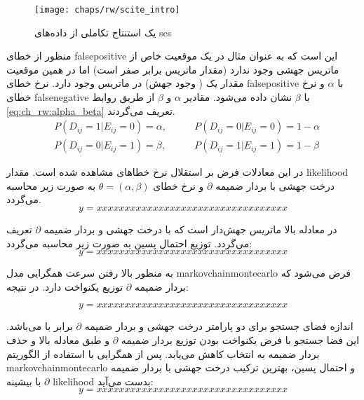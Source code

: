 \begin{figure}[!ht]
	\centerline{\texttt{[image: chaps/rw/scite\_intro]}}
	\caption{یک استنتاج تکاملی از داده‌های \gls{scs} \cite{jahn2016tree}}
	\label{fig:ch_rw:scite_intro}
\end{figure}

منظور از خطای \gls{falsepositive} این است که به عنوان مثال در یک موقعیت خاص از ماتریس  جهشی وجود ندارد (مقدار ماتریس برابر صفر است) اما در همین موقعیت مقدار یک ( وجود جهش) در ماتریس  وجود دارد. نرخ خطای \gls{falsepositive} با  $\alpha$ و نرخ خطای \gls{falsenegative} با $\beta$ نشان داده می‌شود. مقادیر $\alpha$ و $\beta$ از طریق روابط \ref{eq:ch_rw:alpha_beta} تعریف می‌گردند.
\begin{equation}
	\begin{aligned}
		&P(D_{ij}=1|E_{ij}=0)=\alpha, &\qquad P(D_{ij}=0|E_{ij}=0)=1-\alpha \\ &P(D_{ij}=0|E_{ij}=1)=\beta, &\qquad P(D_{ij}=1|E_{ij}=1)=1-\beta
	\end{aligned}
	\label{eq:ch_rw:alpha_beta}
\end{equation}

 در این معادلات فرض بر استقلال نرخ خطاهای مشاهده شده است. مقدار \gls{likelihood} درخت جهشی  با بردار ضمیمه $\partial$ و نرخ خطای $\theta = (\alpha, \beta)$ به صورت زیر محاسبه می‌گردد. 
 \begin{equation}
 	y=xxxxxxxxxxxxxxxxxxxxxxxxxxxxxxxxxx
 \end{equation}
 
 در معادله بالا  ماتریس جهش‌دار است که با درخت جهشی  و بردار ضمیمه $\partial$  تعریف می‌گردد. توزیع احتمال پسین به صورت زیر محاسبه می‌گردد: 
 \begin{equation}
	y=xxxxxxxxxxxxxxxxxxxxxxxxxxxxxxxxxx
\end{equation}

به منظور بالا رفتن سرعت همگرایی مدل \gls{markovchainmontecarlo} فرض می‌شود که بردار ضمیمه $\partial$ توزیع یکنواخت دارد. در نتیجه: 

 \begin{equation}
	y=xxxxxxxxxxxxxxxxxxxxxxxxxxxxxxxxxx
\end{equation}


اندازه فضای جستجو برای دو پارامتر درخت جهشی  و بردار ضمیمه $\partial$ برابر با  می‌باشد. این فضا جستجو با فرض یکنواخت بودن توزیع بردار ضمیمه $\partial$ و طبق معادله بالا و حذف بردار ضمیمه به  انتخاب کاهش می‌یابد. پس از همگرایی با استفاده از الگوریتم \gls{markovchainmontecarlo} و احتمال پسین، بهترین ترکیب درخت جهشی  با بردار ضمیمه $\partial$ با بیشینه \gls{likelihood} بدست می‌آید: 
 \begin{equation}
	y=xxxxxxxxxxxxxxxxxxxxxxxxxxxxxxxxxx
\end{equation}

